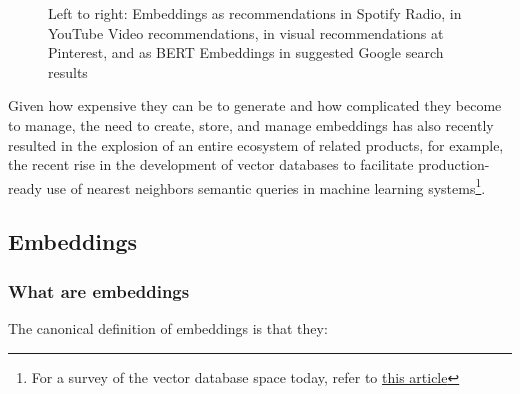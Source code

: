 \documentclass[11pt]{diazessay} %
\begin{document}
\begin{figure}[!ht]
\caption{Left to right: Embeddings as recommendations in Spotify Radio, in YouTube Video recommendations, in visual recommendations at Pinterest, and as BERT Embeddings in suggested Google search results}
\end{figure}

Given how expensive they can be to generate and how complicated they become to manage, the need to create, store, and manage embeddings has also recently resulted in the explosion of an entire ecosystem of related products, for example, the recent rise in the development of vector databases to facilitate production-ready use of nearest neighbors semantic queries in machine learning systems\footnote{For a survey of the vector database space today, refer to  \href{https://dmitry-kan.medium.com/landscape-of-vector-databases-d241b279f486}{this article}}.

\subsection{Embeddings}
 
\subsubsection{What are embeddings}
The canonical definition of embeddings is that they: 
\end{document}
